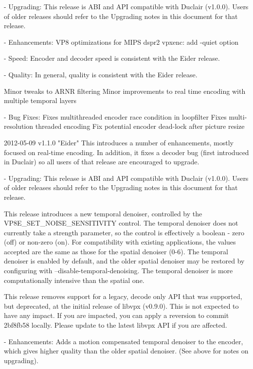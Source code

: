 \begin{DoxyVerbInclude}
  - Upgrading:
    This release is ABI and API compatible with Duclair (v1.0.0). Users
    of older releases should refer to the Upgrading notes in this
    document for that release.

  - Enhancements:
      VP8 optimizations for MIPS dspr2
      vpxenc: add -quiet option

  - Speed:
      Encoder and decoder speed is consistent with the Eider release.

  - Quality:
      In general, quality is consistent with the Eider release.

      Minor tweaks to ARNR filtering
      Minor improvements to real time encoding with multiple temporal layers

  - Bug Fixes:
      Fixes multithreaded encoder race condition in loopfilter
      Fixes multi-resolution threaded encoding
      Fix potential encoder dead-lock after picture resize


2012-05-09 v1.1.0 "Eider"
  This introduces a number of enhancements, mostly focused on real-time
  encoding. In addition, it fixes a decoder bug (first introduced in
  Duclair) so all users of that release are encouraged to upgrade.

  - Upgrading:
    This release is ABI and API compatible with Duclair (v1.0.0). Users
    of older releases should refer to the Upgrading notes in this
    document for that release.

    This release introduces a new temporal denoiser, controlled by the
    VP8E_SET_NOISE_SENSITIVITY control. The temporal denoiser does not
    currently take a strength parameter, so the control is effectively
    a boolean - zero (off) or non-zero (on). For compatibility with
    existing applications, the values accepted are the same as those
    for the spatial denoiser (0-6). The temporal denoiser is enabled
    by default, and the older spatial denoiser may be restored by
    configuring with --disable-temporal-denoising. The temporal denoiser
    is more computationally intensive than the spatial one.

    This release removes support for a legacy, decode only API that was
    supported, but deprecated, at the initial release of libvpx
    (v0.9.0). This is not expected to have any impact. If you are
    impacted, you can apply a reversion to commit 2bf8fb58 locally.
    Please update to the latest libvpx API if you are affected.

  - Enhancements:
      Adds a motion compensated temporal denoiser to the encoder, which
      gives higher quality than the older spatial denoiser. (See above
      for notes on upgrading).


\end{DoxyVerbInclude}
